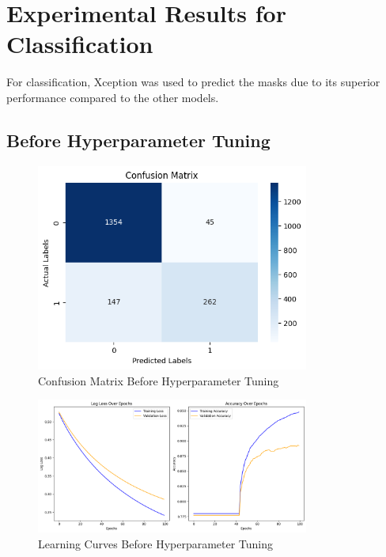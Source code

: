 \documentclass{article}
\begin{document}
\section*{Experimental Results for Classification}
For classification, Xception was used to predict the masks due to its superior performance compared to the other models.

\subsection*{Before Hyperparameter Tuning}
\begin{figure}[H]
    \centering
    \includegraphics[width=0.8\textwidth]{plots/xgbconf_before.png}
    \caption{Confusion Matrix Before Hyperparameter Tuning}
    \label{fig:class_conf_before}
\end{figure}

\begin{figure}[H]
    \centering
    \includegraphics[width=0.8\textwidth]{plots/xgb_learning_before.png}
    \caption{Learning Curves Before Hyperparameter Tuning}
    \label{fig:class_learn_before}
\end{figure}
\end{document}

